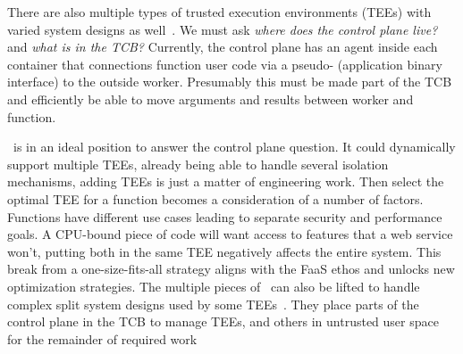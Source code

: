 There are also multiple types of trusted execution environments (TEEs) with varied system designs as well~\cite{arnautov2016scone,wang2022virtee,tsai2017graphene,jia2022hyperenclave}.
We must ask \emph{where does the control plane live?} and \emph{what is in the TCB?}
Currently, the control plane has an agent inside each container that connections function user code via a pseudo- (application binary interface) to the outside worker.
Presumably this must be made part of the TCB and efficiently be able to move arguments and results between worker and function.

\sysname~is in an ideal position to answer the control plane question.
It could dynamically support multiple TEEs, already being able to handle several isolation mechanisms, adding TEEs is just a matter of engineering work.
Then select the optimal TEE for a function becomes a consideration of a number of factors.
Functions have different use cases leading to separate security and performance goals.
A CPU-bound piece of code will want access to features that a web service won't, putting both in the same TEE negatively affects the entire system. 
This break from a one-size-fits-all strategy aligns with the FaaS ethos and unlocks new optimization strategies.
The multiple pieces of \sysname~can also be lifted to handle complex split system designs used by some TEEs~\cite{tsai2017graphene,jia2022hyperenclave}.
They place parts of the control plane in the TCB to manage TEEs, and others in untrusted user space for the remainder of required work
